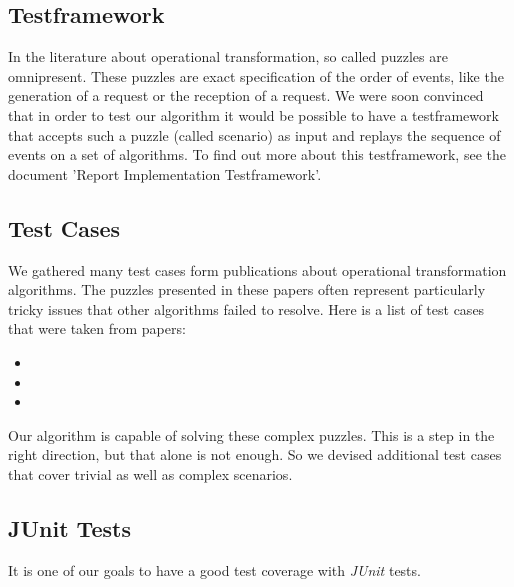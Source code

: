 \subsection{Testframework}
In the literature about operational transformation, so called puzzles are omnipresent. These puzzles are exact specification of the order of events, like the generation of a request or the reception of a request. We were soon convinced that in order to test our algorithm it would be possible to have a testframework that accepts such a puzzle (called scenario) as input and replays the sequence of events on a set of algorithms. To find out more about this testframework, see the document 'Report Implementation Testframework'.

\subsection{Test Cases}
We gathered many test cases form publications about operational transformation algorithms. The puzzles presented in these papers often represent particularly tricky issues that other algorithms failed to resolve. Here is a list of test cases that were taken from papers:

\begin{itemize}
 \item 
 \item 
 \item 
\end{itemize}

Our algorithm is capable of solving these complex puzzles. This is a step in the right direction, but that alone is not enough. So we devised additional test cases that cover trivial as well as complex scenarios.

\subsection{JUnit Tests}
It is one of our goals to have a good test coverage with \emph{JUnit} tests.
